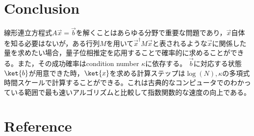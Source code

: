 \documentclass[b5paper,papersize,dvipdfmx,fleqn]{jsarticle}
\begin{document}
\section{Conclusion}
線形連立方程式$A\vec{x}=\vec{b}$を解くことはあらゆる分野で重要な問題であり，$\vec{x}$自体を知る必要はないが，ある行列$M$を用いて$\vec{x}^\dagger M \vec{x}$と表されるような$\vec{x}$に関係した量を求めたい場合，量子位相推定を応用することで確率的に求めることができる。また，その成功確率はcondition number $\kappa $に依存する。
$\vec{b}$に対応する状態$\ket{b}$が用意できた時，$\ket{x}$を求める計算ステップは$\log(N),\kappa $の多項式時間スケールで計算することができる。これは古典的なコンピュータでのわかっている範囲で最も速いアルゴリズムと比較して指数関数的な速度の向上である。


\section{Reference}


% 
% 
% 


\end{document}
